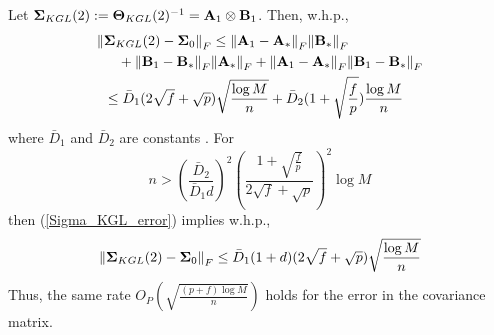 \begin{IEEEproof}
Let ${\mathbf{\Sigma}}_{KGL}(2):={\mathbf{\Theta}}_{KGL}(2)^{-1}={\mathbf{A}}_1\otimes {\mathbf{B}}_1$. Then, w.h.p.,
\begin{align}
	{ \parallel } & {\mathbf{\Sigma}}_{KGL}(2)-{\mathbf{\Sigma}}_0 { \parallel }_F \leq { \parallel } {\mathbf{A}}_1-{\mathbf{A}}_*{ \parallel }_F { \parallel } {\mathbf{B}}_*{ \parallel }_F \nonumber \\
		&\quad + { \parallel } {\mathbf{B}}_1-{\mathbf{B}}_*{ \parallel }_F { \parallel } {\mathbf{A}}_*{ \parallel }_F + { \parallel }{\mathbf{A}}_1-{\mathbf{A}}_*{ \parallel }_F { \parallel }{\mathbf{B}}_1-{\mathbf{B}}_*{ \parallel }_F \nonumber \\
		&\leq \bar{D}_1 (2\sqrt{f}+\sqrt{p}) \sqrt{\frac{\log M}{n}} + \bar{D}_2 (1+\sqrt{\frac{f}{p}}) \frac{\log M}{n} \label{Sigma_KGL_error}
\end{align}
where $\bar{D}_1$ and $\bar{D}_2$ are constants \cite{TsiligkaridisTSP}.
For
\begin{equation*}
	n>(\frac{\bar{D}_2}{\bar{D}_1 d})^2 \left(\frac{1+\sqrt{\frac{f}{p}}}{2\sqrt{f}+\sqrt{p}}\right)^2 \log M
\end{equation*}
then (\ref{Sigma_KGL_error}) implies w.h.p.,
\begin{equation*}
	{ \parallel } {\mathbf{\Sigma}}_{KGL}(2)-{\mathbf{\Sigma}}_0 { \parallel }_F \leq \bar{D}_1 (1+d) (2\sqrt{f}+\sqrt{p}) \sqrt{\frac{\log M}{n}}
\end{equation*}
Thus, the same rate $O_P\left( \sqrt{\frac{(p+f) \log M}{n}} \right)$ holds for the error in the covariance matrix.




\end{IEEEproof}
